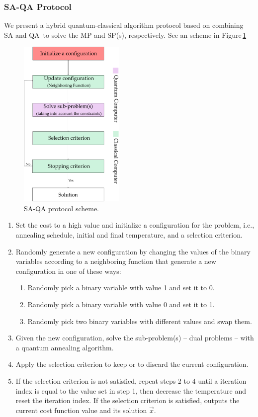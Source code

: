 \subsubsection{SA-QA Protocol}
We present a hybrid quantum-classical algorithm protocol based on combining SA and QA\,\cite{Ding2019ImplementationDesign} to solve the MP and SP(s), respectively. See an scheme in Figure\,\ref{fig:SA_QAProtocol} 
\begin{figure}[H]
\centering
\includegraphics[width=0.45\textwidth]{Figures/SAQAProtocol_Layer 1.pdf} 
\caption{SA-QA protocol scheme.}
\label{fig:SA_QAProtocol}
\end{figure}
\begin{enumerate}
    \item Set the cost to a high value and initialize a configuration for the problem, i.e., annealing schedule, initial and final temperature, and a selection criterion.
    \item Randomly generate a new configuration by changing the values of the binary variables according to a neighboring function that generate a new configuration in one of these ways:
    \begin{enumerate}
        \item Randomly pick a binary variable with value 1 and set it to 0.
        \item Randomly pick a binary variable with value 0 and set it to 1.
        \item Randomly pick two binary variables with different values and swap them.
    \end{enumerate}
    \item Given the new configuration, solve the sub-problem(s) -- dual problems -- with a quantum annealing algorithm.
    \item Apply the selection criterion to keep or to discard the current configuration.
    \item If the selection criterion is not satisfied, repeat steps 2 to 4 until a iteration index is equal to the value set in step 1, then decrease the temperature and reset the iteration index. If the selection criterion is satisfied, outputs the current cost function value and its solution $\vec{x}$.
\end{enumerate}
